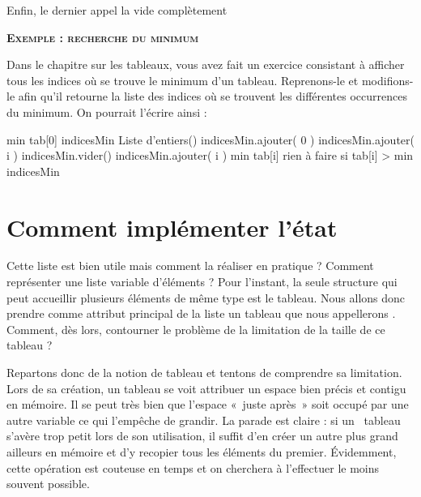 		Enfin, le dernier appel la vide complètement
		
		\bigskip
		{\sffamily\bfseries\scshape
		Exemple : recherche du minimum}
		
		Dans le chapitre sur les tableaux, vous avez fait un exercice consistant
		à afficher tous les indices où se trouve le minimum d’un tableau.
		Reprenons-le et modifions-le afin qu’il retourne la liste des indices
		où se trouvent les différentes occurrences du minimum. On pourrait
		l’écrire ainsi :
		
		\begin{LDA}
				\Let min \Gets tab[0]
				\Let indicesMin \Gets {} Liste d'entiers()
				\Stmt indicesMin.ajouter( 0 )
						\Stmt indicesMin.ajouter( i )
						\Stmt indicesMin.vider() 
						\Stmt indicesMin.ajouter( i )
						\Let min \Gets tab[i]
					\EndIf \Comment rien à faire si tab[i] > min
				\EndFor
				\Return indicesMin
			\EndAlgo
		\end{LDA}
	
	\section{Comment implémenter l’état}
	
		Cette liste est bien utile mais comment la réaliser en pratique ?
		Comment représenter une liste variable d’éléments ? Pour
		l'instant, la seule structure qui peut accueillir
		plusieurs éléments de même type est le tableau. Nous allons donc
		prendre comme attribut principal de la liste un tableau que nous
		appellerons . Comment, dès lors, contourner
		le problème de la limitation de la taille de ce tableau ?
		
		Repartons donc de la notion de tableau et tentons de comprendre sa
		limitation. Lors de sa création, un tableau se voit attribuer un espace
		bien précis et contigu en mémoire. Il se peut très bien que
		l'espace «~juste après~» soit occupé par une autre
		variable ce qui l'empêche de grandir. La parade est
		claire : si un \ tableau s’avère trop petit lors de son utilisation, il
		suffit d’en créer un autre plus grand ailleurs en mémoire et d’y
		recopier tous les éléments du premier. Évidemment, cette opération est
		couteuse en temps et on cherchera à l’effectuer le moins souvent
		possible.
		
